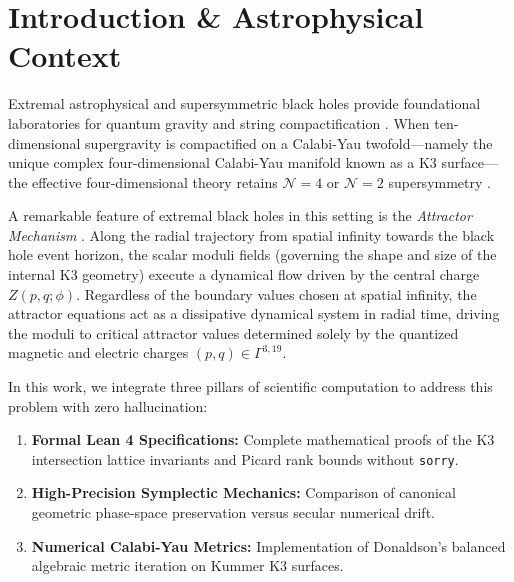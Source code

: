 \documentclass[11pt, a4paper]{article}
\begin{document}
\vspace{1.0em}

\section{Introduction \& Astrophysical Context}
Extremal astrophysical and supersymmetric black holes provide foundational laboratories for quantum gravity and string compactification \cite{strominger1996, ferrara1995}. When ten-dimensional supergravity is compactified on a Calabi-Yau twofold—namely the unique complex four-dimensional Calabi-Yau manifold known as a K3 surface—the effective four-dimensional theory retains $\mathcal{N}=4$ or $\mathcal{N}=2$ supersymmetry \cite{aspinwall1996}.

A remarkable feature of extremal black holes in this setting is the \emph{Attractor Mechanism} \cite{ferrara1995, moore1998}. Along the radial trajectory from spatial infinity towards the black hole event horizon, the scalar moduli fields (governing the shape and size of the internal K3 geometry) execute a dynamical flow driven by the central charge $Z(p, q; \phi)$. Regardless of the boundary values chosen at spatial infinity, the attractor equations act as a dissipative dynamical system in radial time, driving the moduli to critical attractor values determined solely by the quantized magnetic and electric charges $(p, q) \in \Gamma^{3,19}$.

In this work, we integrate three pillars of scientific computation to address this problem with zero hallucination:
\begin{enumerate}
    \item \textbf{Formal Lean 4 Specifications:} Complete mathematical proofs of the K3 intersection lattice invariants and Picard rank bounds without \texttt{sorry}.
    \item \textbf{High-Precision Symplectic Mechanics:} Comparison of canonical geometric phase-space preservation versus secular numerical drift.
    \item \textbf{Numerical Calabi-Yau Metrics:} Implementation of Donaldson's balanced algebraic metric iteration on Kummer K3 surfaces.
\end{enumerate}
\end{document}
